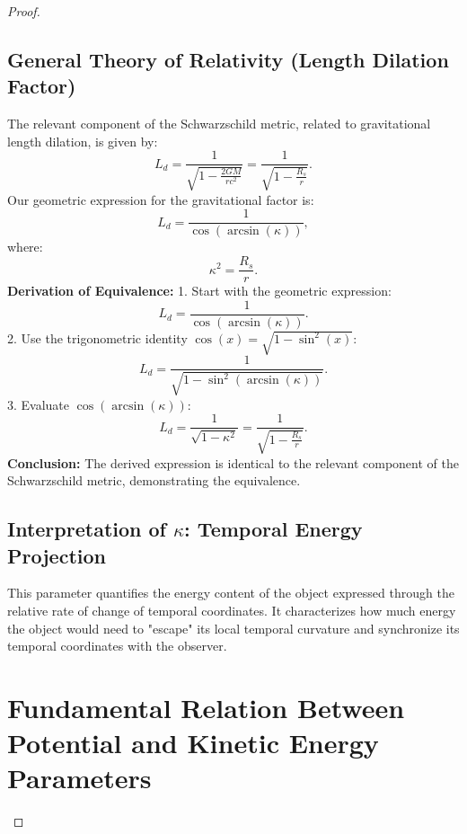 \documentclass{article}
\begin{document}
\begin{proof}
\subsection{General Theory of Relativity (Length Dilation Factor)}
The relevant component of the Schwarzschild metric, related to gravitational length dilation, is given by:
\begin{equation}
L_d = \frac{1}{\sqrt{1 - \frac{2GM}{rc^2}}} = \frac{1}{\sqrt{1 - \frac{R_s}{r}}}.
\end{equation}
Our geometric expression for the gravitational factor is:
\begin{equation}
L_d = \frac{1}{\cos(\arcsin(\kappa))},
\end{equation}
where:
\begin{equation}
\kappa^2 = \frac{R_s}{r}.
\end{equation}
\textbf{Derivation of Equivalence:}
1. Start with the geometric expression:
\begin{equation}
L_d = \frac{1}{\cos(\arcsin(\kappa))}.
\end{equation}
2. Use the trigonometric identity \(\cos(x) = \sqrt{1 - \sin^2(x)}\):
\begin{equation}
L_d = \frac{1}{\sqrt{1 - \sin^2(\arcsin(\kappa))}}.
\end{equation}
3. Evaluate \(\cos(\arcsin(\kappa))\):
\begin{equation}
L_d = \frac{1}{\sqrt{1 - \kappa^2}}=
\frac{1}{\sqrt{1 - \frac{R_s}{r}}}.
\end{equation}
\textbf{Conclusion:} The derived expression is identical to the relevant component of the Schwarzschild metric, demonstrating the equivalence.

\subsection{Interpretation of \(\kappa\): Temporal Energy Projection}
This parameter quantifies the energy content of the object expressed through the relative rate of change of temporal coordinates. It characterizes how much energy the object would need to "escape" its local temporal curvature and synchronize its temporal coordinates with the observer.

\section{Fundamental Relation Between Potential and Kinetic Energy Parameters}



\end{proof}
\end{document}
